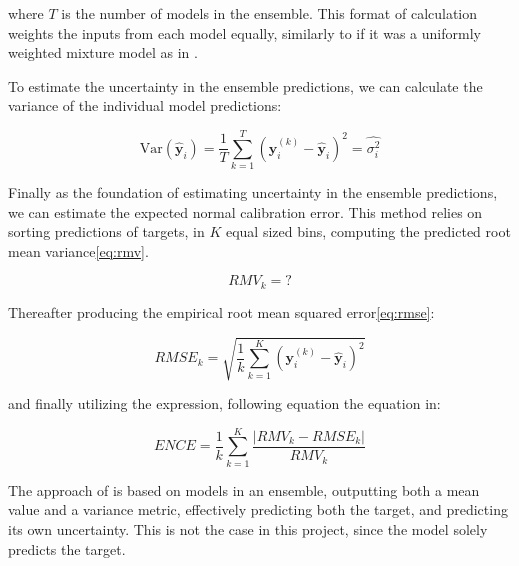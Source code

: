 where $T$ is the number of models in the ensemble. This format of calculation weights the inputs from each model equally,
similarly to if it was a uniformly weighted mixture model as in \cite{Busk2021}.

To estimate the uncertainty in the ensemble predictions, we can calculate the variance of the individual model
predictions\cite{Tran2019}:

\begin{equation}\label{eq:variance-ensemble}
    \text{Var}(\hat{\mathbf{y}}_i) = \frac{1}{T} \sum_{k=1}^T (\mathbf{y}_i^{(k)} - \hat{\mathbf{y}}_i)^2 = \hat{\sigma^{2}_{i}}
\end{equation}


Finally as the foundation of estimating uncertainty in the ensemble predictions, we can estimate the expected normal calibration error.
This method relies on sorting predictions of targets, in $K$ equal sized bins, computing the predicted root mean variance\ref{eq:rmv}.

\begin{equation}\label{eq:rmv}
    RMV_{k} = ?
\end{equation}

Thereafter producing the empirical root mean squared error\ref{eq:rmse}:

\begin{equation}\label{eq:rmse}
    RMSE_{k} = \sqrt{\frac{1}{k} \sum_{k=1}^K \left( \mathbf{y}_i^{(k)} - \hat{\mathbf{y}}_i \right)^2}
\end{equation}

and finally utilizing the expression, following equation the equation in\cite{Busk2021}:

\begin{equation}\label{eq:calibration-error}
    ENCE = \frac{1}{k} \sum_{k=1}^K \frac{|RMV_{k} - RMSE_{k}|}{RMV_{k}}
\end{equation}

The approach of \cite{Busk2021} is based on models in an ensemble, outputting both a mean value and a variance metric, effectively
predicting both the target, and predicting its own uncertainty. This is not the case in this project, since the model solely predicts
the target.

